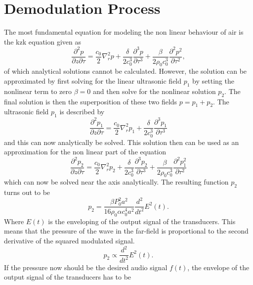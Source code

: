 \section{Demodulation Process}\label{3_sec:demodulation}
The most fundamental equation for modeling the non linear behaviour of air is the \acrfull{kzk} equation \cite{MIT_Ultrasound} given as
\begin{equation}
    \frac{\partial^2 p}{\partial z \partial \tau} 
    = 
    \frac{c_0}{2} \nabla^2_rp
    + 
    \frac{\delta}{2c_0^3}\frac{\partial^3 p}{\partial \tau^3} 
    + 
    \frac{\beta}{2\rho_0c_0^3}\frac{\partial^2 p^2}{\partial \tau^2},
\end{equation}
of which analytical solutions cannot be calculated.
However, the solution can be approximated by first solving for the linear ultrasonic field $p_1$ by setting the nonlinear term to zero $\beta = 0$ and then solve for the nonlinear solution $p_2$. The final solution is then the superposition of these two fields $p = p_1 + p_2$.
The ultrasonic field $p_1$ is described by 
\begin{equation}
     \frac{\partial^2 p_1}{\partial z \partial \tau} 
    = 
    \frac{c_0}{2} \nabla^2_rp_1 
    + 
    \frac{\delta}{2c_0^3}\frac{\partial^3 p_1}{\partial \tau^3} 
\end{equation}
and this can now analytically be solved. 
This solution then can be used as an approximation for the non linear part of the equation
\begin{equation}
     \frac{\partial^2 p_2}{\partial z \partial \tau} 
    = 
    \frac{c_0}{2} \nabla^2_rp_2 
    + 
    \frac{\delta}{2c_0^3}\frac{\partial^3 p_2}{\partial \tau^3} 
    + 
    \frac{\beta}{2\rho_0c_0^3}\frac{\partial^2 p_1^2}{\partial \tau^2}
\end{equation}
which can now be solved near the axis analytically.
The resulting function $p_2$ turns out to be 
\begin{equation}
    p_2 = \frac{\beta P_0^2 a^2}{16 \rho_0 \alpha c_0^4 a^2}\frac{d^2}{dt^2} E^2(t).
\end{equation}
Where $E(t)$ is the enveloping of the output signal of the transducers. 
This means that the  pressure of the wave in the far-field is proportional to the second derivative of the squared modulated signal.
\begin{equation}
    p_2 \propto \frac{d^2}{dt^2} E^2(t).
\end{equation}
If the pressure now should be the desired audio signal $f(t)$, the envelope of the output signal of the transducers has to be
